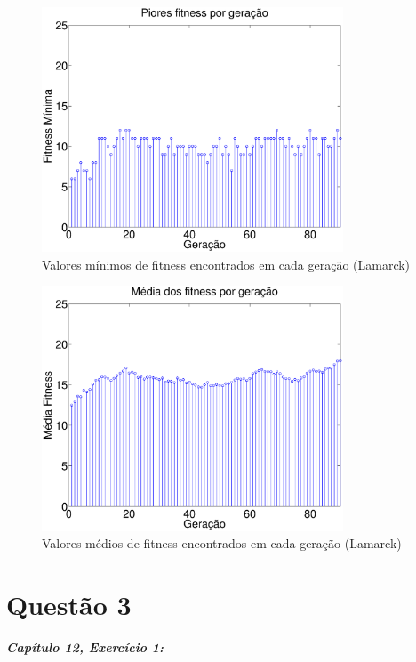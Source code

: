 \documentclass{report}
\begin{document}
\begin{figure}[H]
	\centering
	\includegraphics[width = 0.8\textwidth]{Q02_minimos_fitness_100_ger_lamarck.eps}
	\caption{Valores mínimos de fitness encontrados em cada geração (Lamarck)}
	\label{Q02_minimos_fitness_100_ger_lamarck}
\end{figure}   

\begin{figure}[H]
	\centering
	\includegraphics[width = 0.8\textwidth]{Q02_medias_fitness_100_ger_lamarck.eps}
	\caption{Valores médios de fitness encontrados em cada geração (Lamarck)}	
	\label{Q02_medias_fitness_100_ger_lamarck}
\end{figure}   

\section*{Questão 3}

\textbf{\textit{Capítulo 12, Exercício 1:}}\\
\end{document}
